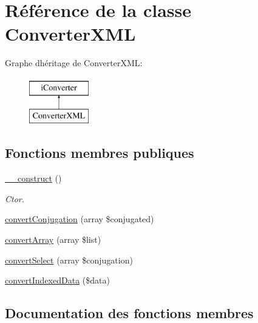 \hypertarget{classConverterXML}{}\section{Référence de la classe Converter\+X\+ML}
\label{classConverterXML}
Graphe d\textquotesingle{}héritage de Converter\+X\+ML\+:\begin{figure}[H]
\begin{center}
\leavevmode
\includegraphics[height=2.000000cm]{classConverterXML}
\end{center}
\end{figure}
\subsection*{Fonctions membres publiques}
\begin{DoxyCompactItemize}
\item 
\hypertarget{classConverterXML_a17333b84c46af11e00e7bbd4e7001bf4}{}\label{classConverterXML_a17333b84c46af11e00e7bbd4e7001bf4} 
\hyperlink{classConverterXML_a17333b84c46af11e00e7bbd4e7001bf4}{\+\_\+\+\_\+construct} ()
\begin{DoxyCompactList}\small\item\em Ctor. \end{DoxyCompactList}\item 
\hyperlink{classConverterXML_a4c2d281657ce13ceb048b56824fec42a}{convert\+Conjugation} (array \$conjugated)
\item 
\hyperlink{classConverterXML_adfb936c9e38f4cee04c0c16db4aa1f34}{convert\+Array} (array \$list)
\item 
\hyperlink{classConverterXML_a68b03941080baea355f4d9c71743343e}{convert\+Select} (array \$conjugation)
\item 
\hyperlink{classConverterXML_ab7c370229f1693cea20750b07cc0d1e7}{convert\+Indexed\+Data} (\$data)
\end{DoxyCompactItemize}


\subsection{Documentation des fonctions membres}
\hypertarget{classConverterXML_adfb936c9e38f4cee04c0c16db4aa1f34}{}\label{classConverterXML_adfb936c9e38f4cee04c0c16db4aa1f34} 

